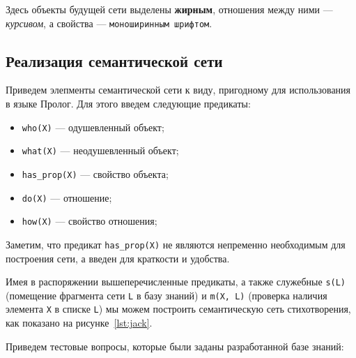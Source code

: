 Здесь объекты будущей сети выделены \textbf{жирным},
отношения между ними --- \textit{курсивом},
а свойства --- \texttt{моноширинным шрифтом}.


\subsection{Реализация семантической сети}

Приведем элепменты семантической сети к виду,
пригодному для использования в языке Пролог.
Для этого введем следующие предикаты:

\begin{itemize}
\item \texttt{who(X)} --- одушевленный объект;
\item \texttt{what(X)} --- неодушевленный объект;
\item \texttt{has\_prop(X)} --- свойство объекта;
\item \texttt{do(X)} --- отношение;
\item \texttt{how(X)} --- свойство отношения;
\end{itemize}

Заметим, что предикат \texttt{has\_prop(X)}
не являются непременно необходимым для построения сети,
а введен для краткости и удобства.

Имея в распоряжении вышеперечисленные предикаты,
а также служебные
\texttt{s(L)} (помещение фрагмента сети \texttt{L} в базу знаний) и
\texttt{m(X, L)} (проверка наличия элемента \texttt{X} в списке \texttt{L})
мы можем построить семантическую сеть стихотворения,
как показано на рисунке~\ref{lst:jack}.

\pagebreak



\pagebreak

Приведем тестовые вопросы, которые были заданы разработанной базе знаний:

